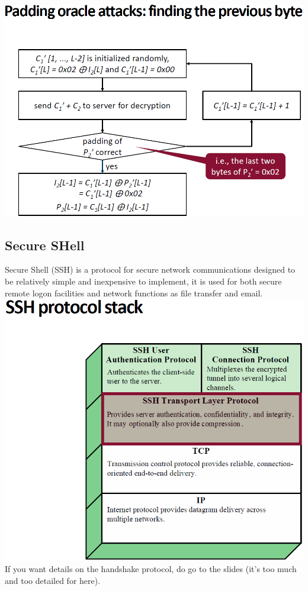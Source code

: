 \documentclass[12pt]{article}
\begin{document}
 \includegraphics[width=0.8\linewidth]{./slides/L7P3PADPREV.PNG}
 
 \subsection{Secure SHell}
 Secure Shell (SSH) is a protocol for secure network communications designed to be relatively simple and inexpensive to implement, it is used for both secure remote logon facilities and network functions as file transfer and email.\\
 \includegraphics[width=\linewidth]{./slides/L7P4SSHSTACK.PNG}\\
 If you want details on the handshake protocol, do go to the slides (it's too much and too detailed for here).\\
\end{document}
